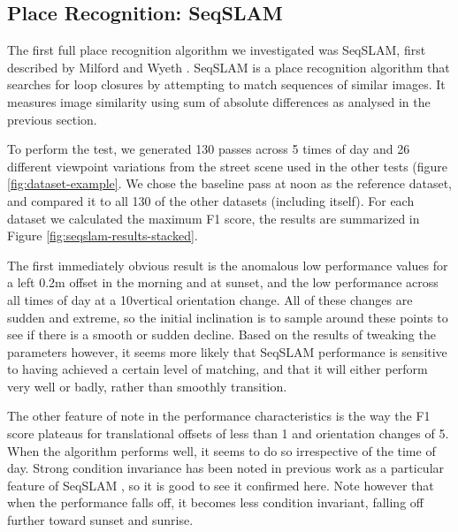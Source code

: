 \documentclass[letterpaper, 10 pt, conference]{ieeeconf}  %
\begin{document}

\subsection{Place Recognition: SeqSLAM}

The first full place recognition algorithm we investigated was SeqSLAM, first described by Milford and Wyeth \cite{Milford2012}. SeqSLAM is a place recognition algorithm that searches for loop closures by attempting to match sequences of similar images. It measures image similarity using sum of absolute differences as analysed in the previous section.

To perform the test, we generated 130 passes across 5 times of day and 26 different viewpoint variations from the street scene used in the other tests (figure \ref{fig:dataset-example}. We chose the baseline pass at noon as the reference dataset, and compared it to all 130 of the other datasets (including itself). For each dataset we calculated the maximum F1 score, the results are summarized in Figure \ref{fig:seqslam-results-stacked}.

The first immediately obvious result is the anomalous low performance values for a left 0.2m offset in the morning and at sunset, and the low performance across all times of day at a 10\degree vertical orientation change.  All of these changes are sudden and extreme, so the initial inclination is to sample around these points to see if there is a smooth or sudden decline. Based on the results of tweaking the parameters however, it seems more likely that SeqSLAM performance is sensitive to having achieved a certain level of matching, and that it will either perform very well or badly, rather than smoothly transition.

The other feature of note in the performance characteristics is the way the F1 score plateaus for translational offsets of less than 1 and orientation changes of 5\degree. When the algorithm performs well, it seems to do so irrespective of the time of day. Strong condition invariance has been noted in previous work as a particular feature of SeqSLAM \cite{Milford2012}, so it is good to see it confirmed here. Note however that when the performance falls off, it becomes less condition invariant, falling off further toward sunset and sunrise.
\end{document}
